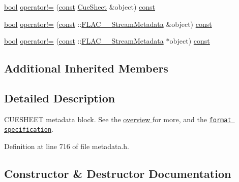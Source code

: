 {\bf }\par
\begin{DoxyCompactItemize}
\item 
\hyperlink{mac_2config_2i386_2lib-src_2libsoxr_2soxr-config_8h_abb452686968e48b67397da5f97445f5b}{bool} \hyperlink{class_f_l_a_c_1_1_metadata_1_1_cue_sheet_a4e9388122366f6eecd3c61eb4a142dfb}{operator!=} (\hyperlink{getopt1_8c_a2c212835823e3c54a8ab6d95c652660e}{const} \hyperlink{class_f_l_a_c_1_1_metadata_1_1_cue_sheet}{Cue\+Sheet} \&object) \hyperlink{getopt1_8c_a2c212835823e3c54a8ab6d95c652660e}{const} 
\item 
\hyperlink{mac_2config_2i386_2lib-src_2libsoxr_2soxr-config_8h_abb452686968e48b67397da5f97445f5b}{bool} \hyperlink{class_f_l_a_c_1_1_metadata_1_1_cue_sheet_a89e08f4e1e11e25018ab6e1a9ab05cb2}{operator!=} (\hyperlink{getopt1_8c_a2c212835823e3c54a8ab6d95c652660e}{const} \+::\hyperlink{struct_f_l_a_c_____stream_metadata}{F\+L\+A\+C\+\_\+\+\_\+\+Stream\+Metadata} \&object) \hyperlink{getopt1_8c_a2c212835823e3c54a8ab6d95c652660e}{const} 
\item 
\hyperlink{mac_2config_2i386_2lib-src_2libsoxr_2soxr-config_8h_abb452686968e48b67397da5f97445f5b}{bool} \hyperlink{class_f_l_a_c_1_1_metadata_1_1_cue_sheet_a28a1f2f3bbb5c6735ecbec2d8d4d812a}{operator!=} (\hyperlink{getopt1_8c_a2c212835823e3c54a8ab6d95c652660e}{const} \+::\hyperlink{struct_f_l_a_c_____stream_metadata}{F\+L\+A\+C\+\_\+\+\_\+\+Stream\+Metadata} $\ast$object) \hyperlink{getopt1_8c_a2c212835823e3c54a8ab6d95c652660e}{const} 
\end{DoxyCompactItemize}

\subsection*{Additional Inherited Members}


\subsection{Detailed Description}
C\+U\+E\+S\+H\+E\+ET metadata block. See the \hyperlink{group__flacpp__metadata__object}{overview } for more, and the \href{../format.html#metadata_block_cuesheet}{\tt format specification}. 

Definition at line 716 of file metadata.\+h.



\subsection{Constructor \& Destructor Documentation}
